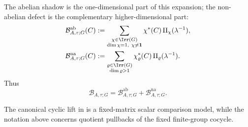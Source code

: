 \noindent
The abelian shadow is the one-dimensional part of this expansion; the
non-abelian defect is the complementary higher-dimensional part:
\begin{equation}\label{eq:abelian-shadow-defect}
  \begin{aligned}
    \mathcal B_{A,\tau;G}^{\mathrm{ab}}(C)
    &:=
    \sum_{\substack{\chi\in\Irr(G)\\ \dim\chi=1,\ \chi\neq \mathbf 1}}
      \chi^\ast(C)\,\Pi_\chi(\lambda^{-1}), \\
    \mathcal B_{A,\tau;G}^{\mathrm{na}}(C)
    &:=
    \sum_{\substack{\varrho\in\Irr(G)\\ \dim\varrho>1}}
      \chi_\varrho^\ast(C)\,\Pi_\varrho(\lambda^{-1}).
  \end{aligned}
\end{equation}
Thus
\begin{equation}\label{eq:abelian-shadow-defect-sum}
  \mathcal B_{A,\tau;G}
  =
  \mathcal B_{A,\tau;G}^{\mathrm{ab}}
  +
  \mathcal B_{A,\tau;G}^{\mathrm{na}}.
\end{equation}

\noindent
The canonical cyclic lift in  is a fixed-matrix scalar
comparison model, while the notation above concerns quotient pullbacks of the
fixed finite-group cocycle.
